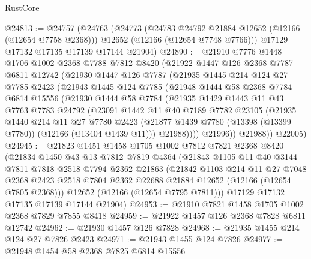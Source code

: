 \begin{lexlean}{RustCore}
\begin{coremodule}
@24813 := @24757
    (@24763
      (@24773
        (@24783 @24792 @21884 @12652 (@12166 (@12654 @7758 @2368)))
        @12652
        (@12166 (@12654 @7748 @7766)))
      @17129
      @17132
      @17135
      @17139
      @17144
      @21904)
@24890 := @21910
    @7776
    @1448
    @1706
    @1002
    @2368
    @7788
    @7812
    @8420
    (@21922
      @1447
      @126
      @2368
      @7787
      @6811
      @12742
      (@21930
        @1447
        @126
        @7787
        (@21935
          @1445
          @214
          @124
          @27
          @7785
          @2423
          (@21943
            @1445
            @124
            @7785
            (@21948
              @1444
              @58
              @2368
              @7784
              @6814
              @15556
              (@21930
                @1444
                @58
                @7784
                (@21935
                  @1429
                  @1443
                  @11
                  @43
                  @7763
                  @7783
                  @24792
                  (@23091
                    @1442
                    @11
                    @40
                    @7189
                    @7782
                    @23105
                    (@21935
                      @1440
                      @214
                      @11
                      @27
                      @7780
                      @2423
                      (@21877 @1439 @7780 (@13398 (@13399 @7780)) (@12166 (@13404 @1439 @11)))
                      @21988))))
              @21996))
          @21988))
      @22005)
@24945 := @21823
    @1451
    @1458
    @1705
    @1002
    @7812
    @7821
    @2368
    @8420
    (@21834
      @1450
      @43
      @13
      @7812
      @7819
      @4364
      (@21843
        @1105
        @11
        @40
        @3144
        @7811
        @7818
        @2518
        @7794
        @2362
        @21863
        (@21842
          @1103
          @214
          @11
          @27
          @7048
          @2368
          @2423
          @2518
          @7804
          @2362
          @22688
          @21884
          @12652
          (@12166 (@12654 @7805 @2368)))
        @12652
        (@12166 (@12654 @7795 @7811)))
      @17129
      @17132
      @17135
      @17139
      @17144
      @21904)
@24953 := @21910 @7821 @1458 @1705 @1002 @2368 @7829 @7855 @8418
@24959 := @21922 @1457 @126 @2368 @7828 @6811 @12742
@24962 := @21930 @1457 @126 @7828
@24968 := @21935 @1455 @214 @124 @27 @7826 @2423
@24971 := @21943 @1455 @124 @7826
@24977 := @21948 @1454 @58 @2368 @7825 @6814 @15556

\end{coremodule}
\end{lexlean}
